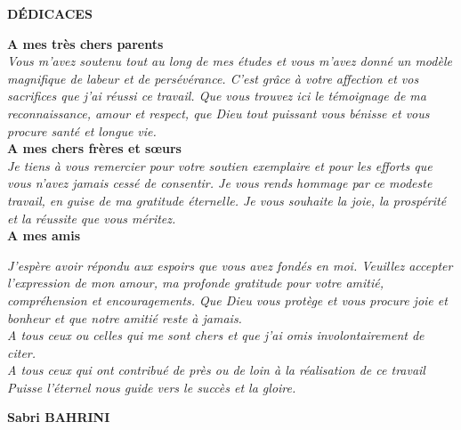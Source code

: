 \pagestyle{empty}

\vspace*{5mm}

\begin{flushright}
\textbf{\Large DÉDICACES\\}
\end{flushright}

\vspace{10mm}
\begin{spacing}{2}


\begin{center}


\textbf{A mes très chers parents}\\

\textit{Vous m'avez soutenu tout au long de mes études et vous m'avez donné un modèle magnifique de labeur et de persévérance. C'est grâce à votre affection et vos sacrifices que j'ai réussi ce travail. Que vous trouvez ici le témoignage de ma reconnaissance, amour et respect, que Dieu tout puissant vous bénisse et vous procure santé et longue vie.}\\

\textbf{A mes chers frères et sœurs}\\

\textit{Je tiens à vous remercier pour votre soutien exemplaire et pour les efforts que vous n'avez jamais cessé de consentir. Je vous rends hommage par ce modeste travail, en guise de ma gratitude éternelle. Je vous souhaite la joie, la prospérité et la réussite que vous méritez.}\\

\textbf{A mes amis \\}

\textit{J'espère avoir répondu aux espoirs que vous avez fondés en moi. Veuillez accepter l'expression de mon amour, ma profonde gratitude pour votre amitié, compréhension et encouragements. 
Que Dieu vous protège et vous procure joie et bonheur et que notre amitié reste à jamais.}\\

\textit{A tous ceux ou celles qui me sont chers et que j'ai omis involontairement de citer.}\\

\textit{A tous ceux qui ont contribué de près ou de loin à la réalisation de ce travail Puisse l'éternel nous guide vers le succès et la gloire.}



\end{center}


\end{spacing}
\begin{flushright}
\textbf{Sabri BAHRINI}
\end{flushright}
